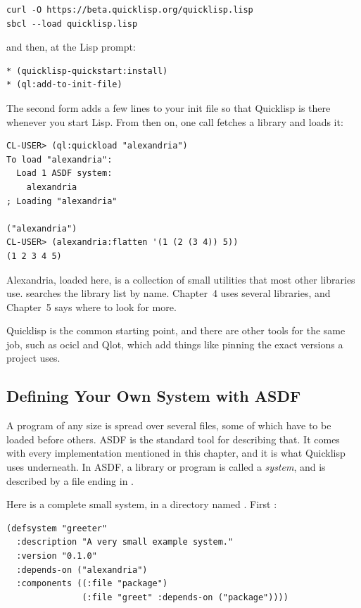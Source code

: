 \begin{verbatim}
curl -O https://beta.quicklisp.org/quicklisp.lisp
sbcl --load quicklisp.lisp
\end{verbatim}

\noindent
and then, at the Lisp prompt:

\begin{verbatim}
* (quicklisp-quickstart:install)
* (ql:add-to-init-file)
\end{verbatim}

The second form adds a few lines to your init file so that Quicklisp
is there whenever you start Lisp. From then on, one call fetches a
library and loads it:

\begin{verbatim}
CL-USER> (ql:quickload "alexandria")
To load "alexandria":
  Load 1 ASDF system:
    alexandria
; Loading "alexandria"

("alexandria")
CL-USER> (alexandria:flatten '(1 (2 (3 4)) 5))
(1 2 3 4 5)
\end{verbatim}

Alexandria, loaded here, is a collection of small utilities that most
other libraries use.  searches the
library list by name. Chapter~4 uses several libraries, and
Chapter~5 says where to look for more.

Quicklisp is the common starting point, and there are other tools for
the same job, such as ocicl and Qlot, which add things like pinning
the exact versions a project uses.

\subsection{Defining Your Own System with ASDF}
\label{sec:asdf}

A program of any size is spread over several files, some of which have
to be loaded before others. ASDF is the standard tool for describing
that. It comes with every implementation mentioned in this chapter,
and it is what Quicklisp uses underneath. In ASDF, a library or
program is called a \emph{system}, and is described by a file
ending in .

Here is a complete small system, in a directory named
. First :

\begin{verbatim}
(defsystem "greeter"
  :description "A very small example system."
  :version "0.1.0"
  :depends-on ("alexandria")
  :components ((:file "package")
               (:file "greet" :depends-on ("package"))))
\end{verbatim}

